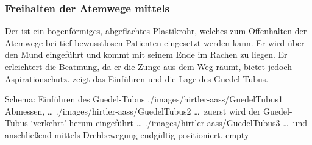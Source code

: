 \subsubsection{Freihalten der Atemwege mittels }
\Text
{\TxBeschreibung}
{%
Der  ist ein bogenförmiges, abgeflachtes
Plastikrohr, welches zum Offenhalten der Atemwege bei tief
bewusstlosen Patienten eingesetzt werden kann. Er wird über
den Mund eingeführt und kommt mit seinem Ende im Rachen zu
liegen. Er erleichtert die Beatmung, da er die Zunge
aus dem Weg räumt, bietet jedoch 
Aspirationschutz. 
zeigt das Einführen und die Lage des Guedel-Tubus.
}
{}
{}
{}
{}




\begin{PictureSeriesWide}{}{Schema: Einführen des Guedel-Tubus
\label{fig:guedel-einfuehren}}
{./images/hirtler-aass/GuedelTubus1}
{Abmessen, \ldots}
{./images/hirtler-aass/GuedelTubus2}
{\ldots\ zuerst wird der Guedel-Tubus \enquote*{verkehrt}
herum eingeführt \ldots}
{./images/hirtler-aass/GuedelTubus3}
{\ldots\ und anschließend mittels Drehbewegung endgültig
positioniert.}
{empty}
{}
\end{PictureSeriesWide}




